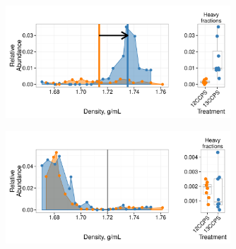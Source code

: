 \begin{figure}[H] \begin{center}
\centerline{\includegraphics[width=0.75\textwidth]{figures/conceptual1/conceptual1.pdf}}
\caption[Density profile for an example "responder"]{\protect}\label{fig:c1}
\end{center} \end{figure}

\begin{figure}[H] \begin{center}
\centerline{\includegraphics[width=0.75\textwidth]{figures/conceptual3/conceptual3.pdf}}
\caption[Density profile for example "non-responder"]{\protect}\label{fig:c3}
\end{center} \end{figure}





